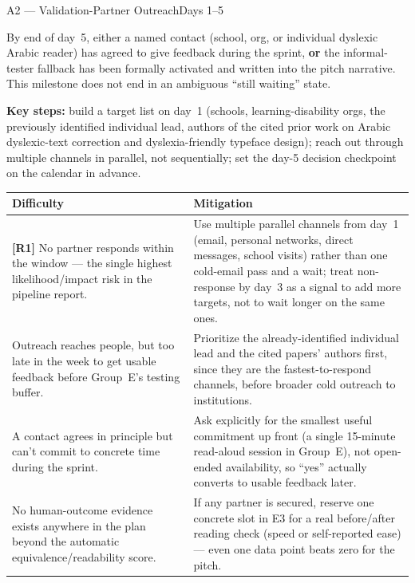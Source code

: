 \documentclass[11pt,a4paper]{article}
\begin{document}
\vspace{6pt}
\begin{milestonehead}{A2 --- Validation-Partner Outreach}{Days 1--5}
\begin{goalbox}
By end of day~5, either a named contact (school, org, or individual dyslexic
Arabic reader) has agreed to give feedback during the sprint, \textbf{or} the
informal-tester fallback has been formally activated and written into the
pitch narrative. This milestone does not end in an ambiguous ``still
waiting'' state.
\end{goalbox}

\textbf{Key steps:} build a target list on day~1 (schools, learning-disability
orgs, the previously identified individual lead, authors of the cited prior
work on Arabic dyslexic-text correction and dyslexia-friendly typeface
design); reach out through multiple channels in parallel, not sequentially;
set the day-5 decision checkpoint on the calendar in advance.

\begin{center}
\small
\begin{tabular}{@{}p{6.3cm}p{6.9cm}@{}}
\toprule
\textbf{Difficulty} & \textbf{Mitigation} \\
\midrule
\textbf{[R1]} No partner responds within the window --- the single highest
likelihood/impact risk in the pipeline report. & Use multiple parallel
channels from day~1 (email, personal networks, direct messages, school
visits) rather than one cold-email pass and a wait; treat non-response by
day~3 as a signal to add more targets, not to wait longer on the same ones. \\
\addlinespace
Outreach reaches people, but too late in the week to get usable feedback
before Group~E's testing buffer. & Prioritize the already-identified
individual lead and the cited papers' authors first, since they are the
fastest-to-respond channels, before broader cold outreach to institutions. \\
\addlinespace
A contact agrees in principle but can't commit to concrete time during the
sprint. & Ask explicitly for the smallest useful commitment up front (a
single 15-minute read-aloud session in Group~E), not open-ended
availability, so ``yes'' actually converts to usable feedback later. \\
\addlinespace
No human-outcome evidence exists anywhere in the plan beyond the automatic
equivalence/readability score. & If any partner is secured, reserve one
concrete slot in E3 for a real before/after reading check (speed or
self-reported ease) --- even one data point beats zero for the pitch. \\
\bottomrule
\end{tabular}
\end{center}
\end{milestonehead}
\end{document}
